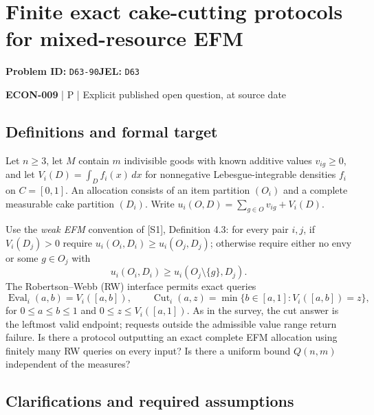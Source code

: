 \documentclass[11pt,a4paper]{article}
\begin{document}
\section*{Finite exact cake-cutting protocols for mixed-resource EFM}
\textbf{Problem ID:} \texttt{D63-90}\quad \textbf{JEL:} \texttt{D63}\par
\label{problem:OP-0595}


\label{audited:ECON-009}

{\sffamily\small\color{muted}\textbf{ECON-009} | P | Explicit published open question, at source date\par}

\subsection*{Definitions and formal target}

Let $n\geq3$, let $M$ contain $m$ indivisible goods with known additive values $v_{ig}\geq0$, and let $V_i(D)=\int_D f_i(x)\,dx$ for nonnegative Lebesgue-integrable densities $f_i$ on $C=[0,1]$. An allocation consists of an item partition $(O_i)$ and a complete measurable cake partition $(D_i)$. Write $u_i(O,D)=\sum_{g\in O}v_{ig}+V_i(D)$.

Use the \emph{weak EFM} convention of [S1], Definition 4.3: for every pair $i,j$, if $V_i(D_j)>0$ require $u_i(O_i,D_i)\geq u_i(O_j,D_j)$; otherwise require either no envy or some $g\in O_j$ with
\[
u_i(O_i,D_i)\geq u_i(O_j\setminus\{g\},D_j).
\]
The Robertson--Webb (RW) interface permits exact queries
\[
\operatorname{Eval}_i(a,b)=V_i([a,b]),\qquad
\operatorname{Cut}_i(a,z)=\min\{b\in[a,1]:V_i([a,b])=z\},
\]
for $0\leq a\leq b\leq1$ and $0\leq z\leq V_i([a,1])$. As in the survey, the cut answer is the leftmost valid endpoint; requests outside the admissible value range return failure. Is there a protocol outputting an exact complete EFM allocation using finitely many RW queries on every input? Is there a uniform bound $Q(n,m)$ independent of the measures?

\subsection*{Clarifications and required assumptions}
\end{document}
